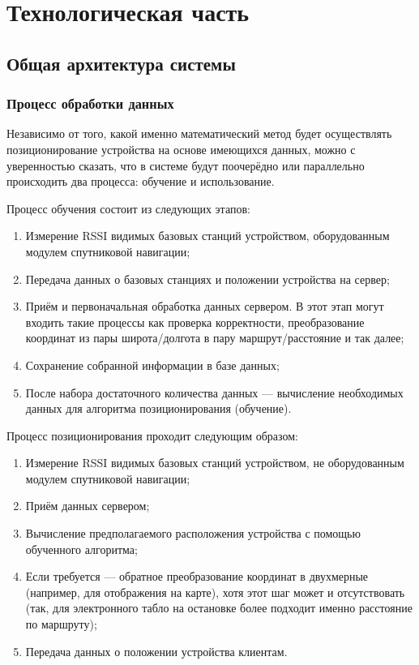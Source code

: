 \chapter{Технологическая часть}

\section{Общая архитектура системы}

\subsection{Процесс обработки данных}

Независимо от того, какой именно математический метод будет осуществлять позиционирование устройства на основе имеющихся данных, можно с уверенностью сказать, что в системе будут поочерёдно или параллельно происходить два процесса: обучение и использование.

Процесс обучения состоит из следующих этапов:

\begin{enumerate}
	\item
		Измерение RSSI видимых базовых станций устройством, оборудованным модулем спутниковой навигации;
	\item
		Передача данных о базовых станциях и положении устройства на сервер;
	\item
		Приём и первоначальная обработка данных сервером. В этот этап могут входить такие процессы как проверка корректности, преобразование координат из пары широта/долгота в пару маршрут/расстояние и так далее;
	\item
		Сохранение собранной информации в базе данных;
	\item
		После набора достаточного количества данных --- вычисление необходимых данных для алгоритма позиционирования (обучение).
\end{enumerate}

Процесс позиционирования проходит следующим образом:

\begin{enumerate}
	\item
		Измерение RSSI видимых базовых станций устройством, не оборудованным модулем спутниковой навигации;
	\item
		Приём данных сервером;
	\item
		Вычисление предполагаемого расположения устройства с помощью обученного алгоритма;
	\item
		Если требуется --- обратное преобразование координат в двухмерные (например, для отображения на карте), хотя этот шаг может и отсутствовать (так, для электронного табло на остановке более подходит именно расстояние по маршруту);
	\item
		Передача данных о положении устройства клиентам.
\end{enumerate}


